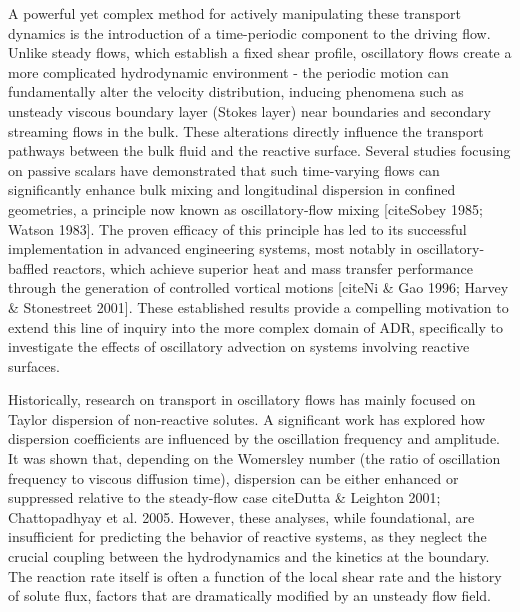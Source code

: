 \documentclass[lineno]{JFM-FLM_Au}
\begin{document}
A powerful yet complex method for actively manipulating these transport dynamics is the introduction of a time-periodic component to the driving flow. Unlike steady flows, which establish a fixed shear profile, oscillatory flows create a more complicated hydrodynamic environment - the periodic motion can fundamentally alter the velocity distribution, inducing phenomena such as unsteady viscous boundary layer (Stokes layer) near boundaries and secondary streaming flows in the bulk. These alterations directly influence the transport pathways between the bulk fluid and the reactive surface. Several studies focusing on passive scalars have demonstrated that such time-varying flows can significantly enhance bulk mixing and longitudinal dispersion in confined geometries, a principle now known as oscillatory-flow mixing [cite{Sobey 1985; Watson 1983}]. The proven efficacy of this principle has led to its successful implementation in advanced engineering systems, most notably in oscillatory-baffled reactors, which achieve superior heat and mass transfer performance through the generation of controlled vortical motions [cite{Ni \& Gao 1996; Harvey \& Stonestreet 2001}]. These established results provide a compelling motivation to extend this line of inquiry into the more complex domain of ADR, specifically to investigate the effects of oscillatory advection on systems involving  reactive surfaces.

Historically, research on transport in oscillatory flows has mainly focused on Taylor dispersion of non-reactive solutes. A significant work has explored how dispersion coefficients are influenced by the oscillation frequency and amplitude. It was shown that, depending on the Womersley number (the ratio of oscillation frequency to viscous diffusion time), dispersion can be either enhanced or suppressed relative to the steady-flow case \citep{dutta2001dispersion} cite{Dutta \& Leighton 2001; Chattopadhyay et al. 2005}. However, these analyses, while foundational, are insufficient for predicting the behavior of reactive systems, as they neglect the crucial coupling between the hydrodynamics and the kinetics at the boundary. The reaction rate itself is often a function of the local shear rate and the history of solute flux, factors that are dramatically modified by an unsteady flow field.

\end{document}
